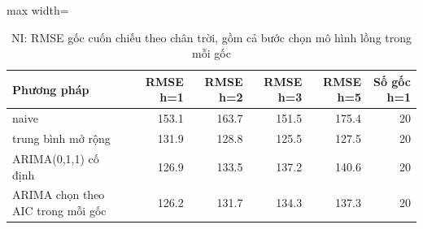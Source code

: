 \begin{table}[H]
\centering\footnotesize
\caption{NI: RMSE gốc cuốn chiếu theo chân trời, gồm cả bước chọn mô hình lồng trong mỗi gốc}\label{tab:tab_b12_12_ni_rolling}
\begin{adjustbox}{max width=\linewidth}
\begin{tabular}{|>{\raggedright\arraybackslash}p{}|r|r|r|r|r|}
\toprule
Phương pháp & RMSE h=1 & RMSE h=2 & RMSE h=3 & RMSE h=5 & Số gốc h=1 \\
\midrule
naive & 153.1 & 163.7 & 151.5 & 175.4 & 20 \\[3pt]
trung bình mở rộng & 131.9 & 128.8 & 125.5 & 127.5 & 20 \\[3pt]
ARIMA(0,1,1) cố định & 126.9 & 133.5 & 137.2 & 140.6 & 20 \\[3pt]
ARIMA chọn theo AIC trong mỗi gốc & 126.2 & 131.7 & 134.3 & 137.3 & 20 \\[3pt]
\bottomrule
\end{tabular}
\end{adjustbox}
\end{table}
